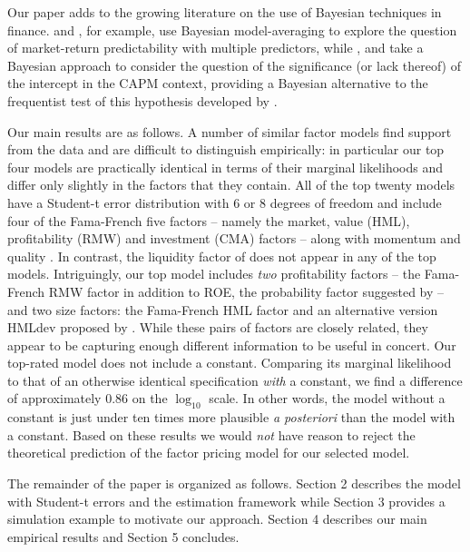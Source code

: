 Our paper adds to the growing literature on the use of Bayesian techniques in finance.
\cite{avramov2002stock} and \cite{cremers2002stock}, for example, use Bayesian model-averaging to explore the question of market-return predictability with multiple predictors, while \cite{shanken1987bayesian}, \cite{harvey1990bayesian} and \cite{avramov2006exact} take a Bayesian approach to consider the question of the significance (or lack thereof) of the intercept in the CAPM context, providing a Bayesian alternative to the frequentist test of this hypothesis developed by \cite{gibbons1989test}.

Our main results are as follows.
A number of similar factor models find support from the data and are difficult to distinguish empirically: in particular our top four models are practically identical in terms of their marginal likelihoods and differ only slightly in the factors that they contain.
All of the top twenty models have a Student-t error distribution with 6 or 8 degrees of freedom and include four of the Fama-French \citep{fama1993common,fama2015five} five factors -- namely the market, value (HML), profitability (RMW) and investment (CMA) factors -- along with momentum \citep{carhart1997persistence} and quality \citep{asness2014quality}.
In contrast, the liquidity factor of \cite{stambaugh2003liquidity} does not appear in any of the top models.
Intriguingly, our top model includes \emph{two} profitability factors -- the Fama-French RMW factor in addition to ROE, the probability factor suggested by \cite{hou2014digesting} -- and two size factors: the Fama-French HML factor and an alternative version HMLdev proposed by \cite{asness2013devil}. 
While these pairs of factors are closely related, they appear to be capturing enough different information to be useful in concert.
Our top-rated model does not include a constant. 
Comparing its marginal likelihood to that of an otherwise identical specification \emph{with} a constant, we find a difference of approximately 0.86 on the $\log_{10}$ scale. 
In other words, the model without a constant is just under ten times more plausible \emph{a posteriori} than the model with a constant.
Based on these results we would \emph{not} have reason to reject the theoretical prediction of the factor pricing model for our selected model.

The remainder of the paper is organized as follows. 
Section 2 describes the model with Student-t errors and the estimation framework while Section 3 provides a simulation example to motivate our approach.
Section 4 describes our main empirical results and Section 5 concludes.

